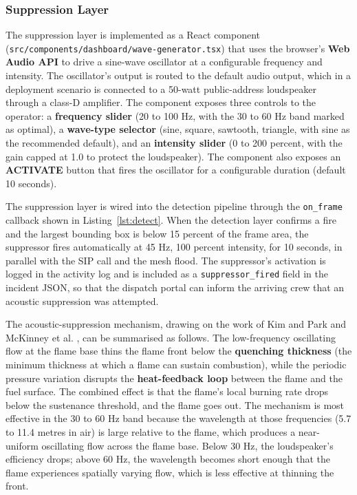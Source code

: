 \subsubsection{Suppression Layer}

The suppression layer is implemented as a React component (\texttt{src/components/dashboard/wave-generator.tsx}) that uses the browser's \textbf{Web Audio API} to drive a sine-wave oscillator at a configurable frequency and intensity. The oscillator's output is routed to the default audio output, which in a deployment scenario is connected to a 50-watt public-address loudspeaker through a class-D amplifier. The component exposes three controls to the operator: a \textbf{frequency slider} (20 to 100 Hz, with the 30 to 60 Hz band marked as optimal), a \textbf{wave-type selector} (sine, square, sawtooth, triangle, with sine as the recommended default), and an \textbf{intensity slider} (0 to 200 percent, with the gain capped at 1.0 to protect the loudspeaker). The component also exposes an \textbf{ACTIVATE} button that fires the oscillator for a configurable duration (default 10 seconds).

The suppression layer is wired into the detection pipeline through the \texttt{on\_frame} callback shown in Listing~\ref{lst:detect}. When the detection layer confirms a fire and the largest bounding box is below 15 percent of the frame area, the suppressor fires automatically at 45 Hz, 100 percent intensity, for 10 seconds, in parallel with the SIP call and the mesh flood. The suppressor's activation is logged in the activity log and is included as a \texttt{suppressor\_fired} field in the incident JSON, so that the dispatch portal can inform the arriving crew that an acoustic suppression was attempted.

The acoustic-suppression mechanism, drawing on the work of Kim and Park \cite{kim2015acoustic} and McKinney et al. \cite{mckinney2019sonic}, can be summarised as follows. The low-frequency oscillating flow at the flame base thins the flame front below the \textbf{quenching thickness} (the minimum thickness at which a flame can sustain combustion), while the periodic pressure variation disrupts the \textbf{heat-feedback loop} between the flame and the fuel surface. The combined effect is that the flame's local burning rate drops below the sustenance threshold, and the flame goes out. The mechanism is most effective in the 30 to 60 Hz band because the wavelength at those frequencies (5.7 to 11.4 metres in air) is large relative to the flame, which produces a near-uniform oscillating flow across the flame base. Below 30 Hz, the loudspeaker's efficiency drops; above 60 Hz, the wavelength becomes short enough that the flame experiences spatially varying flow, which is less effective at thinning the front.

